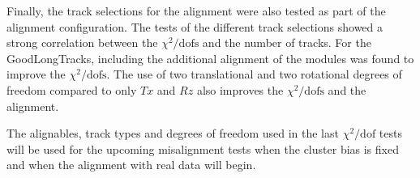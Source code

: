 Finally, the track selections for the alignment were also tested as part of the alignment configuration. The tests of the different track selections showed a strong correlation between the $\chi^2 / \text{dofs}$ and the number of tracks.
For the GoodLongTracks, including the additional alignment of the modules was found to improve the $\chi^2 / \text{dofs}$. The use of two translational and two rotational degrees of freedom compared to only $Tx$ and $Rz$ also improves the $\chi^2 / \text{dofs}$ and the alignment.

The alignables, track types and degrees of freedom used in the last $\chi^2 / \text{dof}$ tests will be used for the upcoming misalignment tests when the cluster bias is fixed and when the alignment with real data will begin.

